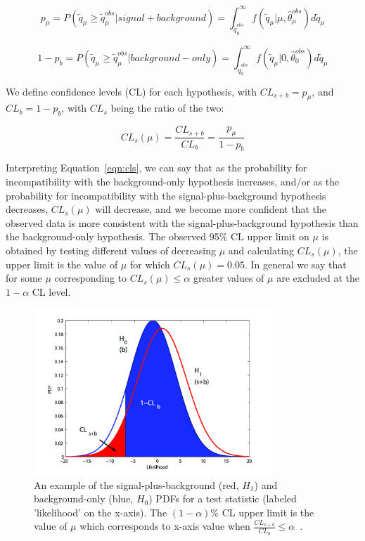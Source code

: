 \begin{equation}
\label{eqn:pvalues1}
p_{\mu} = P(\tilde{q}_{\mu} \geq \tilde{q}_{\mu}^{obs}|signal+background) = \int_{\tilde{q}_{\mu}^{obs}}^{\infty} f(\tilde{q}_{\mu}|\mu,\hat{\theta}_{\mu}^{obs}) d\tilde{q}_{\mu}
\end{equation}

\begin{equation}
\label{eqn:pvalues2}
1- p_{b} = P(\tilde{q}_{\mu} \geq \tilde{q}_{\mu}^{obs}|background-only) = \int_{\tilde{q}_{0}^{obs}}^{\infty} f(\tilde{q}_{\mu}|0,\hat{\theta}_{0}^{obs}) d\tilde{q}_{\mu}
\end{equation}

\noindent We define confidence levels (CL) for each hypothesis, with $CL_{s+b} = p_{\mu}$, and $CL_{b} = 1-p_{b}$, with $CL_{s}$ being the ratio of the two:

\begin{equation}
\label{eqn:cls}
CL_{s}(\mu) = \frac{CL_{s+b}}{CL_{b}} = \frac{p_{\mu}}{1-p_{b}}
\end{equation}

\noindent Interpreting Equation~\ref{eqn:cls}, we can say that as the probability for incompatibility with the background-only hypothesis increases, and/or as the probability
for incompatibility with the signal-plus-background hypothesis decreases, $CL_{s}(\mu)$ will decrease, and we become more confident that the observed data is more consistent with
the signal-plus-background hypothesis than the background-only hypothesis. The observed 95$\%$ CL upper limit on $\mu$ is obtained by testing different values of decreasing $\mu$ and
calculating $CL_{s}(\mu)$, the upper limit is the value of $\mu$ for which $CL_{s}(\mu) = 0.05$. In general we say that for some $\mu$ corresponding to $CL_{s}(\mu) \leq \alpha$
greater values of $\mu$ are excluded at the $1-\alpha$ CL level. 

\begin{figure}[htb]
        \centering 
        \includegraphics[width=0.80\textwidth]{ch10_figs/cls.pdf}
        \caption[Test statistic PDFs for s+b and b-only hypotheses]{An example of the signal-plus-background (red, $H_{1}$) and background-only (blue, $H_{0}$) PDFs for a
          test statistic (labeled 'likelihood' on the x-axis). The $(1-\alpha)\%$ CL upper limit is the value of $\mu$ which corresponds to x-axis value
          when $\frac{CL_{s+b}}{CL_{b}} \leq \alpha$~\cite{lhc4peds}.}
        \label{fig:cls}
\end{figure}

